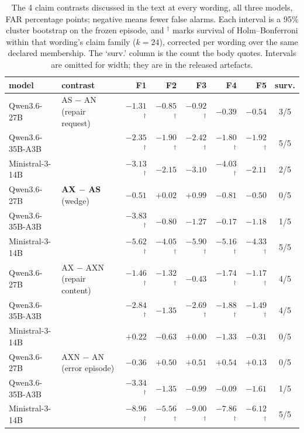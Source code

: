 \documentclass[11pt]{article}
\begin{document}
\begin{table}[t]
\centering\footnotesize
\begin{tabular}{@{}llrrrrrc@{}}
\toprule
model & contrast & F1 & F2 & F3 & F4 & F5 & surv. \\
\midrule
Qwen3.6-27B & AS $-$ AN \, (repair request) & $-1.31$$^{\dagger}$ & $-0.85$$^{\dagger}$ & $-0.92$$^{\dagger}$ & $-0.39$ & $-0.54$ & 3/5 \\
Qwen3.6-35B-A3B &  & $-2.35$$^{\dagger}$ & $-1.90$$^{\dagger}$ & $-2.42$$^{\dagger}$ & $-1.80$$^{\dagger}$ & $-1.92$$^{\dagger}$ & 5/5 \\
Ministral-3-14B &  & $-3.13$$^{\dagger}$ & $-2.15$ & $-3.10$ & $-4.03$$^{\dagger}$ & $-2.11$ & 2/5 \\
\midrule
Qwen3.6-27B & \textbf{AX $-$ AS} \, (wedge) & $-0.51$ & $+0.02$ & $+0.99$ & $-0.81$ & $-0.50$ & 0/5 \\
Qwen3.6-35B-A3B &  & $-3.83$$^{\dagger}$ & $-0.80$ & $-1.27$ & $-0.17$ & $-1.18$ & 1/5 \\
Ministral-3-14B &  & $-5.62$$^{\dagger}$ & $-4.05$$^{\dagger}$ & $-5.90$$^{\dagger}$ & $-5.16$$^{\dagger}$ & $-4.33$$^{\dagger}$ & 5/5 \\
\midrule
Qwen3.6-27B & AX $-$ AXN \, (repair content) & $-1.46$$^{\dagger}$ & $-1.32$$^{\dagger}$ & $-0.43$ & $-1.74$$^{\dagger}$ & $-1.17$$^{\dagger}$ & 4/5 \\
Qwen3.6-35B-A3B &  & $-2.84$$^{\dagger}$ & $-1.35$ & $-2.69$$^{\dagger}$ & $-1.88$$^{\dagger}$ & $-1.49$$^{\dagger}$ & 4/5 \\
Ministral-3-14B &  & $+0.22$ & $-0.63$ & $+0.00$ & $-1.33$ & $-0.31$ & 0/5 \\
\midrule
Qwen3.6-27B & AXN $-$ AN \, (error episode) & $-0.36$ & $+0.50$ & $+0.51$ & $+0.54$ & $+0.13$ & 0/5 \\
Qwen3.6-35B-A3B &  & $-3.34$$^{\dagger}$ & $-1.35$ & $-0.99$ & $-0.09$ & $-1.61$ & 1/5 \\
Ministral-3-14B &  & $-8.96$$^{\dagger}$ & $-5.56$$^{\dagger}$ & $-9.00$$^{\dagger}$ & $-7.86$$^{\dagger}$ & $-6.12$$^{\dagger}$ & 5/5 \\
\bottomrule
\end{tabular}
\caption{The 4 claim contrasts discussed in the text at every wording, all three models, FAR percentage points; negative means fewer false alarms. Each interval is a 95\% cluster bootstrap on the frozen episode, and $^{\dagger}$ marks survival of Holm--Bonferroni within that wording's claim family ($k=24$), corrected per wording over the same declared membership. The `surv.' column is the count the body quotes. Intervals are omitted for width; they are in the released artefacts.}
\label{tab:decomp}
\end{table}
\end{document}
